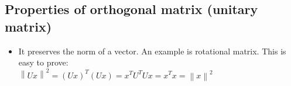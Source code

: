 \documentclass[11pt]{article}
\providecommand{\tightlist}{%
      \setlength{\itemsep}{0pt}\setlength{\parskip}{0pt}}
\begin{document}
    \subsection{Properties of orthogonal matrix (unitary
matrix)}\label{properties-of-orthogonal-matrix-unitary-matrix}

\begin{itemize}
\tightlist
\item
  It preserves the norm of a vector. An example is rotational matrix.
  This is easy to prove:\\
  \(\left\|Ux\right\|^2 = (Ux)^T(Ux) = x^TU^TUx = x^Tx = \left\|x\right\|^2\)
\end{itemize}


    
    
    
    
\end{document}
